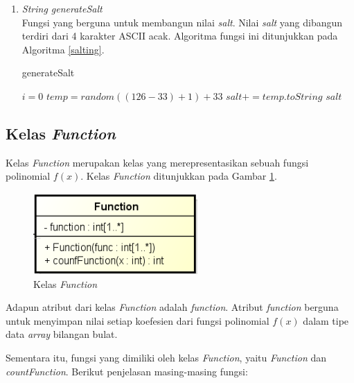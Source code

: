 \begin{enumerate}
	\item \textit{String generateSalt} \\
	Fungsi yang berguna untuk membangun nilai \textit{salt}. Nilai \textit{salt} yang dibangun terdiri dari 4 karakter ASCII acak. Algoritma fungsi ini ditunjukkan pada Algoritma \ref{salting}.
	\begin{algorithm}[H]
		\caption{generateSalt}
		\label{salting}
		\begin{algorithmic}[1]
			  \State $i = 0$
					\State $temp = random((126-33) + 1) + 33$
					\State $salt += temp.toString$
				\EndFor
				\State \Return $salt$
			\EndFunction
		\end{algorithmic}
	\end{algorithm}
\end{enumerate}

\subsection{Kelas \textit{Function}}

Kelas \textit{Function} merupakan kelas yang merepresentasikan sebuah fungsi polinomial \begin{math}f(x)\end{math}. Kelas \textit{Function} ditunjukkan pada Gambar \ref{fig:classfunction}.

\begin{figure}[H]
	\centering
	\includegraphics[scale=0.7]{Gambar/class_function}
	\caption{Kelas \textit{Function}}\label{fig:classfunction}
\end{figure}

Adapun atribut dari kelas \textit{Function} adalah \textit{function}. Atribut \textit{function} berguna untuk menyimpan nilai setiap koefesien dari fungsi polinomial \begin{math}f(x)\end{math} dalam tipe data \textit{array} bilangan bulat.

Sementara itu, fungsi yang dimiliki oleh kelas \textit{Function}, yaitu \textit{Function} dan \textit{countFunction}. Berikut penjelasan masing-masing fungsi:

